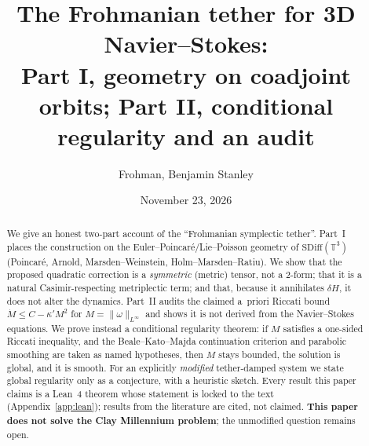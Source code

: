 \documentclass[11pt]{amsart}
\title[The Frohmanian tether: geometry and conditional regularity]{The Frohmanian tether for 3D Navier--Stokes:\\ Part I, geometry on coadjoint orbits; Part II, conditional regularity and an audit}
\author{Frohman, Benjamin Stanley}
\date{November 23, 2026}
\theoremstyle{definition}\newtheorem{definition}[theorem]{Definition}
\theoremstyle{remark}\newtheorem{remark}[theorem]{Remark}
\newcommand{\T}{\mathbb{T}^3}
\begin{document}
\sloppy
\begin{abstract}
We give an honest two-part account of the ``Frohmanian symplectic tether''.
Part~I places the construction on the Euler--Poincar\'e/Lie--Poisson geometry of
$\mathrm{SDiff}(\T)$ (Poincar\'e, Arnold, Marsden--Weinstein, Holm--Marsden--Ratiu).
We show that the proposed quadratic correction is a \emph{symmetric} (metric) tensor, not a 2-form;
that it is a natural Casimir-respecting metriplectic term; and that, because it annihilates
$\delta H$, it does not alter the dynamics. Part~II audits the claimed a~priori Riccati bound
$\dot M\le C-\kappa' M^2$ for $M=\|\omega\|_{L^\infty}$ and shows it is not derived from the
Navier--Stokes equations. We prove instead a conditional regularity theorem: if $M$ satisfies a one-sided
Riccati inequality, and the Beale--Kato--Majda continuation criterion and parabolic smoothing are taken as
named hypotheses, then $M$ stays bounded, the solution is global, and it is smooth. For an explicitly
\emph{modified} tether-damped system we state global regularity only as a conjecture, with a heuristic sketch.
Every result this paper claims is a Lean~4 theorem whose statement is locked to the text (Appendix~\ref{app:lean});
results from the literature are cited, not claimed.
\textbf{This paper does not solve the Clay Millennium problem}; the unmodified question remains open.
\end{abstract}
\maketitle
\end{document}
